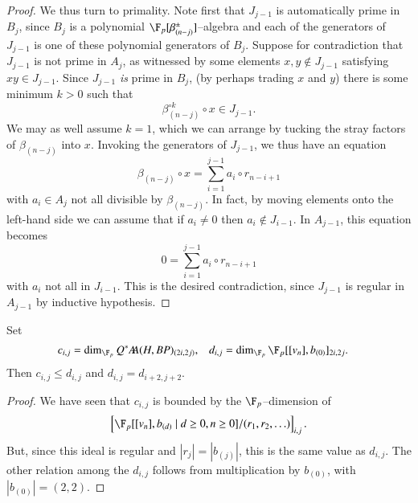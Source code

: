 \begin{proof}
We thus turn to primality.  Note first that $J_{j-1}$ is automatically prime in $B_j$, since $B_j$ is a polynomial $\F_p[\beta_{(n-j)}^\pm]$--algebra and each of the generators of $J_{j-1}$ is one of these polynomial generators of $B_j$.  Suppose for contradiction that $J_{j-1}$ is not prime in $A_j$, as witnessed by some elements $x, y \not\in J_{j-1}$ satisfying $xy \in J_{j-1}$.  Since $J_{j-1}$ \emph{is} prime in $B_j$, (by perhaps trading $x$ and $y$) there is some minimum $k > 0$ such that \[\beta_{(n-j)}^{\circ k} \circ x \in J_{j-1}.\]  We may as well assume $k = 1$, which we can arrange by tucking the stray factors of $\beta_{(n-j)}$ into $x$.  Invoking the generators of $J_{j-1}$, we thus have an equation \[\beta_{(n-j)} \circ x = \sum_{i = 1}^{j-1} a_i \circ r_{n-i+1}\] with $a_i \in A_j$ not all divisible by $\beta_{(n-j)}$.  In fact, by moving elements onto the left-hand side we can assume that if $a_i \ne 0$ then $a_i \not\in J_{i-1}$.  In $A_{j-1}$, this equation becomes \[0 = \sum_{i=1}^{j-1} a_i \circ r_{n-i+1}\] with $a_i$ not all in $J_{i-1}$.  This is the desired contradiction, since $J_{j-1}$ is regular in $A_{j-1}$ by inductive hypothesis.
\end{proof}

\begin{corollary}
Set
\begin{align*}
c_{i,j} & = \dim_{\F_p} Q^* \AA(H, BP)_{(2i, 2j)}, &
d_{i,j} & = \dim_{\F_p} \F_p[[v_n], b_{(0)}]_{2i,2j}.
\end{align*}
Then $c_{i,j} \le d_{i,j}$ and $d_{i,j} = d_{i+2,j+2}$.
\end{corollary}
\begin{proof}
We have seen that $c_{i,j}$ is bounded by the $\F_p$--dimension of \[\left[\F_p[[v_n], b_{(d)} \mid d \ge 0, n \ge 0] / (r_1, r_2, \ldots)\right]_{i,j}.\]  But, since this ideal is regular and $|r_j| = |b_{(j)}|$, this is the same value as $d_{i,j}$.  The other relation among the $d_{i,j}$ follows from multiplication by $b_{(0)}$, with $|b_{(0)}| = (2, 2)$.
\end{proof}

